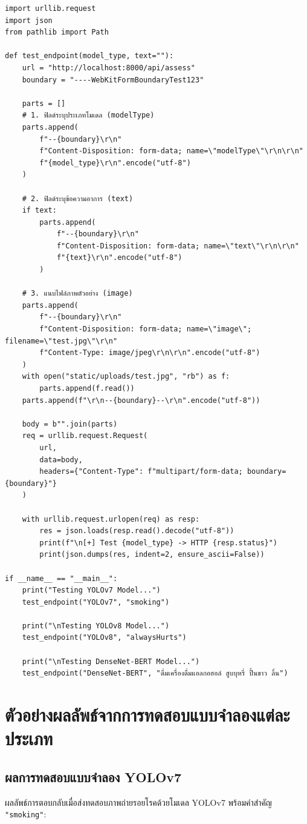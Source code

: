 \begin{verbatim}
import urllib.request
import json
from pathlib import Path

def test_endpoint(model_type, text=""):
    url = "http://localhost:8000/api/assess"
    boundary = "----WebKitFormBoundaryTest123"
    
    parts = []
    # 1. ฟิลด์ระบุประเภทโมเดล (modelType)
    parts.append(
        f"--{boundary}\r\n"
        f"Content-Disposition: form-data; name=\"modelType\"\r\n\r\n"
        f"{model_type}\r\n".encode("utf-8")
    )
    
    # 2. ฟิลด์ระบุข้อความอาการ (text)
    if text:
        parts.append(
            f"--{boundary}\r\n"
            f"Content-Disposition: form-data; name=\"text\"\r\n\r\n"
            f"{text}\r\n".encode("utf-8")
        )
        
    # 3. แนบไฟล์ภาพตัวอย่าง (image)
    parts.append(
        f"--{boundary}\r\n"
        f"Content-Disposition: form-data; name=\"image\"; filename=\"test.jpg\"\r\n"
        f"Content-Type: image/jpeg\r\n\r\n".encode("utf-8")
    )
    with open("static/uploads/test.jpg", "rb") as f:
        parts.append(f.read())
    parts.append(f"\r\n--{boundary}--\r\n".encode("utf-8"))
    
    body = b"".join(parts)
    req = urllib.request.Request(
        url,
        data=body,
        headers={"Content-Type": f"multipart/form-data; boundary={boundary}"}
    )
    
    with urllib.request.urlopen(req) as resp:
        res = json.loads(resp.read().decode("utf-8"))
        print(f"\n[+] Test {model_type} -> HTTP {resp.status}")
        print(json.dumps(res, indent=2, ensure_ascii=False))

if __name__ == "__main__":
    print("Testing YOLOv7 Model...")
    test_endpoint("YOLOv7", "smoking")
    
    print("\nTesting YOLOv8 Model...")
    test_endpoint("YOLOv8", "alwaysHurts")
    
    print("\nTesting DenseNet-BERT Model...")
    test_endpoint("DenseNet-BERT", "ดื่มเครื่องดื่มแอลกอฮอล์ สูบบุหรี่ ปื้นขาว ลิ้น")
\end{verbatim}

\section{ตัวอย่างผลลัพธ์จากการทดสอบแบบจำลองแต่ละประเภท}

\subsection{ผลการทดสอบแบบจำลอง YOLOv7}
ผลลัพธ์การตอบกลับเมื่อส่งทดสอบภาพถ่ายรอยโรคด้วยโมเดล YOLOv7 พร้อมคำสำคัญ \texttt{"smoking"}:

